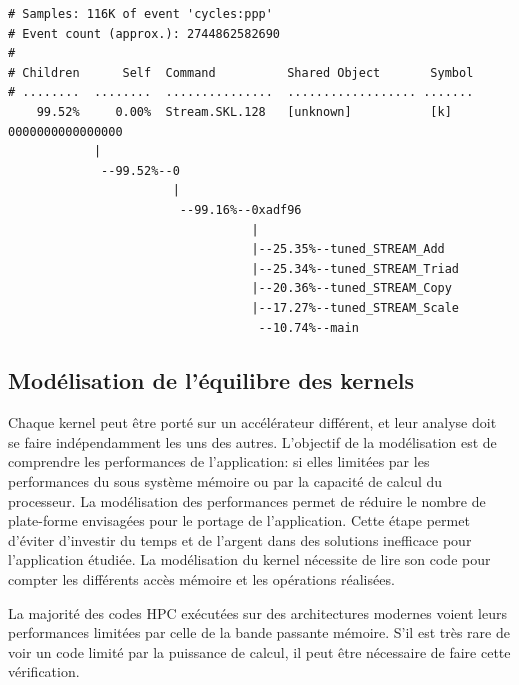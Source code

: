 \begin{lstlisting}[caption=Exemple d'utilisation de l'out perf avec la commande \textit{perf record  -g  -F 97}. Le rapport d'exécution est obtenu avec la commande \textit{perf report --stdio}, float,floatplacement=H, label={perf_example}]
# Samples: 116K of event 'cycles:ppp'
# Event count (approx.): 2744862582690
#
# Children      Self  Command          Shared Object       Symbol                                                                       
# ........  ........  ...............  .................. .......
    99.52%     0.00%  Stream.SKL.128   [unknown]           [k] 0000000000000000
            |          
             --99.52%--0
                       |          
                        --99.16%--0xadf96
                                  |
                                  |--25.35%--tuned_STREAM_Add   
                                  |--25.34%--tuned_STREAM_Triad
                                  |--20.36%--tuned_STREAM_Copy
                                  |--17.27%--tuned_STREAM_Scale
                                   --10.74%--main

\end{lstlisting}



\subsection{Modélisation de l'équilibre des kernels}

Chaque kernel peut être porté sur un accélérateur différent, et leur analyse doit se faire indépendamment les uns des autres. L'objectif de la modélisation est de comprendre les performances de l'application: si elles limitées par les performances du sous système mémoire ou par la capacité de calcul du processeur. La modélisation des performances permet de réduire le nombre de plate-forme envisagées pour le portage de l'application. Cette étape permet d'éviter d'investir du temps et de l'argent dans des solutions inefficace pour l'application étudiée. La modélisation du kernel nécessite de lire son code pour compter les différents accès mémoire et les opérations réalisées.

La majorité des codes HPC exécutées sur des architectures modernes voient leurs performances limitées par celle de la bande passante mémoire. S'il est très rare de voir un code limité par la puissance de calcul, il peut être nécessaire de faire cette vérification. 

